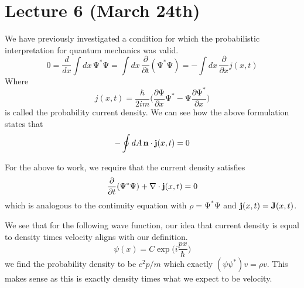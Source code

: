 \section{Lecture 6 (March 24th)}
\begin{recall}
We have previously investigated a condition for which the probabilistic interpretation for quantum mechanics was valid.
\[0=\dfrac{d }{d x}\int dx\,\mathrm{\Psi} ^{*}\mathrm{\Psi} =\int dx\,\dfrac{\partial }{\partial t}(\mathrm{\Psi} ^{*}\mathrm{\Psi} )=-\int dx\,\dfrac{\partial }{\partial x}j(x,t)   \]
Where
\[j(x,t)=\dfrac{\hbar }{2im}\Big(\dfrac{\partial \mathrm{\Psi} }{\partial x}\mathrm{\Psi} ^{*}-\mathrm{\Psi} \dfrac{\partial \mathrm{\Psi}^{*} }{\partial x}  \Big)\]
is called the probability current density. We can see how the above formulation states that
\[-\oint dA\,{\bf n}\cdot {\bf j}(x,t)=0 \]

For the above to work, we require that the current density satisfies
\[\dfrac{\partial }{\partial t}(\mathrm{\Psi} ^{*}\mathrm{\Psi} )+\nabla \cdot {\bf j}(x,t)=0 \]
which is analogous to the continuity equation with $\rho =\mathrm{\Psi} ^{*}\mathrm{\Psi} $ and ${\bf j}(x,t)={\bf J}(x,t)$.
\end{recall}
\vspace{2ex}
\begin{ex}
We see that for the following wave function, our idea that current density is
equal to density times velocity aligns with our definition.
\[\psi (x)=C\exp \Big(i\dfrac{px}{\hbar }\Big)\]
we find the probability density to be $c^2p/m$ which exactly $(\psi \psi ^{*})v=\rho v$. This makes sense as this is exactly density times what we expect to be velocity.
\end{ex}
\vspace{2ex}
